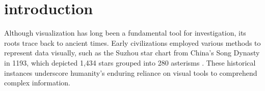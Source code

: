 \section{introduction}
Although visualization has long been a fundamental tool for investigation, its roots trace back to ancient times. Early civilizations employed various methods to represent data visually, such as the Suzhou star chart from China's Song Dynasty in 1193, which depicted 1,434 stars grouped into 280 asterisms . These historical instances underscore humanity's enduring reliance on visual tools to comprehend complex information.

